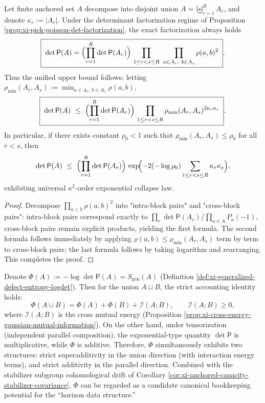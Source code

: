 \begin{corollary}\label{cor:xi-pick-poisson-det-multipartition-kappa2-collapse}
Let finite anchored set \(A\) decompose into disjoint union \(A=\biguplus_{r=1}^{R}A_r\), and denote \(\kappa_r:=|A_r|\).
Under the determinant factorization regime of Proposition \ref{prop:xi-pick-poisson-det-factorization}, the exact factorization always holds
\[
\boxed{\;
\det\mathsf P(A)
=\Bigl(\prod_{r=1}^{R}\det\mathsf P(A_r)\Bigr)\,
\prod_{1\le r<s\le R}\ \prod_{a\in A_r,\ b\in A_s}\rho(a,b)^{2}\; }.
\]
Thus the unified upper bound follows: letting
\(
\rho_{\min}(A_r,A_s):=\min_{a\in A_r,\ b\in A_s}\rho(a,b)
\),
\[
\boxed{\;
\det\mathsf P(A)\ \le\
\Bigl(\prod_{r=1}^{R}\det\mathsf P(A_r)\Bigr)\,
\prod_{1\le r<s\le R}\rho_{\min}(A_r,A_s)^{2\kappa_r\kappa_s}\; }.
\]
In particular, if there exists constant \(\rho_0<1\) such that \(\rho_{\min}(A_r,A_s)\le\rho_0\) for all \(r<s\), then
\[
\det\mathsf P(A)\ \le\ \Bigl(\prod_{r=1}^{R}\det\mathsf P(A_r)\Bigr)\,
\exp\!\Bigl(-2(-\log\rho_0)\sum_{1\le r<s\le R}\kappa_r\kappa_s\Bigr),
\]
exhibiting universal \(\kappa^2\)-order exponential collapse law.
\end{corollary}
\begin{proof}
Decompose \(\prod_{a<b}\rho(a,b)^2\) into "intra-block pairs" and "cross-block pairs": intra-block pairs correspond exactly to \(\prod_r\det\mathsf P(A_r)/\prod_{a\in A}P_a(-1)\), cross-block pairs remain explicit products, yielding the first formula.
The second formula follows immediately by applying \(\rho(a,b)\le \rho_{\min}(A_r,A_s)\) term by term to cross-block pairs; the last formula follows by taking logarithm and rearranging. This completes the proof.
\end{proof}

\begin{remark}\label{rem:xi-anchored-capacity-accounting-structures}
Denote \(\Phi(A):=-\log\det\mathsf P(A)=S_{\mathrm{gen}}(A)\) (Definition \ref{def:xi-generalized-defect-entropy-logdet}).
Then for the union \(A\sqcup B\), the strict accounting identity holds:
\[
\Phi(A\cup B)=\Phi(A)+\Phi(B)+\mathcal I(A;B),\qquad \mathcal I(A;B)\ge 0,
\]
where \(\mathcal I(A;B)\) is the cross mutual energy (Proposition \ref{prop:xi-cross-energy-gaussian-mutual-information}).
On the other hand, under tensorization (independent parallel composition), the exponential-type quantity \(\det\mathsf P\) is multiplicative, while \(\Phi\) is additive.
Therefore, \(\Phi\) simultaneously exhibits two structures: strict superadditivity in the union direction (with interaction energy terms), and strict additivity in the parallel direction.
Combined with the stabilizer subgroup cohomological drift of Corollary \ref{cor:xi-anchored-capacity-stabilizer-covariance}, \(\Phi\) can be regarded as a candidate canonical bookkeeping potential for the ``horizon data structure.''
\end{remark}

